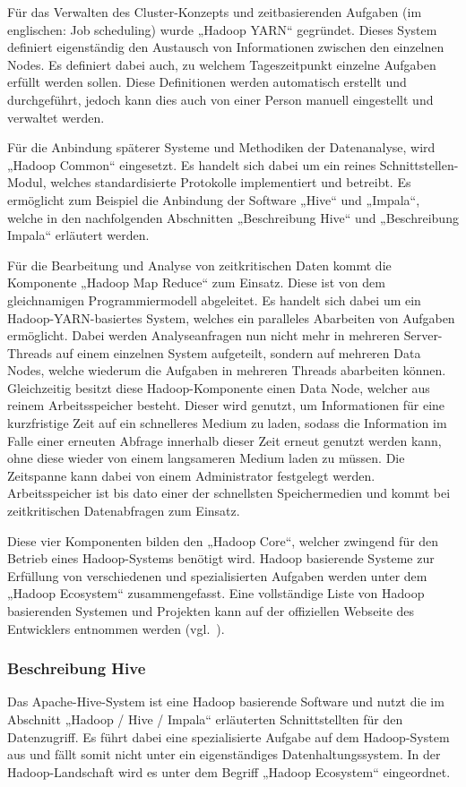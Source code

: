 Für das Verwalten des Cluster\hyp{}Konzepts und zeitbasierenden Aufgaben (im
englischen: Job scheduling) wurde „Hadoop YARN“ gegründet. Dieses System
definiert eigenständig den Austausch von Informationen zwischen den einzelnen
Nodes. Es definiert dabei auch, zu welchem Tageszeitpunkt einzelne Aufgaben
erfüllt werden sollen. Diese Definitionen werden automatisch erstellt und
durchgeführt, jedoch kann dies auch von einer Person manuell eingestellt und
verwaltet werden.

Für die Anbindung späterer Systeme und Methodiken der Datenanalyse, wird
„Hadoop Common“ eingesetzt. Es handelt sich dabei um ein reines
Schnittstellen\hyp{}Modul, welches standardisierte Protokolle implementiert und
betreibt. Es ermöglicht zum Beispiel die Anbindung der Software „Hive“ und
„Impala“, welche in den nachfolgenden Abschnitten „Beschreibung Hive“
und „Beschreibung Impala“ erläutert werden.

Für die Bearbeitung und Analyse von zeitkritischen Daten kommt die Komponente
„Hadoop Map Reduce“ zum Einsatz. Diese ist von dem gleichnamigen
Programmiermodell abgeleitet. Es handelt sich dabei um ein
Hadoop\hyp{}YARN\hyp{}basiertes System, welches ein paralleles Abarbeiten von
Aufgaben ermöglicht.  Dabei werden Analyseanfragen nun nicht mehr in mehreren
Server\hyp{}Threads auf einem einzelnen System aufgeteilt, sondern auf mehreren
Data Nodes, welche wiederum die Aufgaben in mehreren Threads abarbeiten können.
Gleichzeitig besitzt diese Hadoop\hyp{}Komponente einen Data Node, welcher aus
reinem Arbeitsspeicher besteht. Dieser wird genutzt, um Informationen für eine
kurzfristige Zeit auf ein schnelleres Medium zu laden, sodass die Information
im Falle einer erneuten Abfrage innerhalb dieser Zeit erneut genutzt werden
kann, ohne diese wieder von einem langsameren Medium laden zu müssen. Die
Zeitspanne kann dabei von einem Administrator festgelegt werden.
Arbeitsspeicher ist bis dato einer der schnellsten Speichermedien und kommt bei
zeitkritischen Datenabfragen zum Einsatz.

Diese vier Komponenten bilden den „Hadoop Core“, welcher zwingend für den
Betrieb eines Hadoop\hyp{}Systems benötigt wird. Hadoop basierende Systeme zur
Erfüllung von verschiedenen und spezialisierten Aufgaben werden unter dem
„Hadoop Ecosystem“ zusammengefasst. Eine vollständige Liste von Hadoop
basierenden Systemen und Projekten kann auf der offiziellen Webseite des
Entwicklers entnommen werden (vgl.~\cite{Hadoop_related_projects}).
\nl%

\subsubsection{Beschreibung Hive}
\label{subsubsec:hive_beschreibung}
Das Apache\hyp{}Hive\hyp{}System ist eine Hadoop basierende Software und nutzt
die im Abschnitt „Hadoop / Hive / Impala“ erläuterten Schnittstellten
für den Datenzugriff. Es führt dabei eine spezialisierte Aufgabe auf dem
Hadoop\hyp{}System aus und fällt somit nicht unter ein eigenständiges
Datenhaltungssystem. In der Hadoop\hyp{}Landschaft wird es unter dem Begriff
„Hadoop Ecosystem“ eingeordnet.

